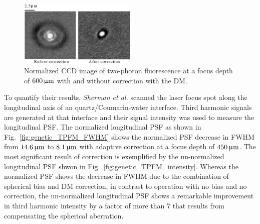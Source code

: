 \begin{figure}
	\centering
		\includegraphics[width=0.50\textwidth]{images/genetic_TPFM_correction}
	\caption{Normalized CCD image of two-photon fluorescence at a focus depth of $\unit[600]{\upmu m}$ with and without correction with the DM.~\cite{Genetic_MPFM}}
	\label{fig:genetic_TPFM_correction}
\end{figure}

To quantify their results, \emph{Sherman et al.} scanned the laser focus spot along the longitudinal axis of an quartz/Coumarin-water interface. Third harmonic signals are generated at that interface and their signal intensity was used to measure the longitudinal PSF. The normalized longitudinal PSF as shown in Fig.~\ref{fig:genetic_TPFM_FWHM} shows the normalized PSF decrease in FWHM from $\unit[14.6]{\upmu m}$ to $\unit[8.1]{\upmu m}$ with adaptive correction at a focus depth of $\unit[450]{\upmu m}$. The most significant result of correction is exemplified by the un-normalized longitudinal PSF shwon in Fig.~\ref{fig:genetic_TPFM_intensity}. Whereas the normalized PSF shows the decrease in FWHM due to the combination of spherical bias and DM correction, in contrast to operation with no bias and no correction, the un-normalized longitudinal PSF shows a remarkable improvement in third harmonic intensity by a factor of more than 7 that results from compensating the spherical aberration.


